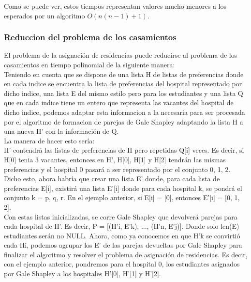 \documentclass{article}
\begin{document}
                Como se puede ver, estos tiempos representan valores mucho menores a
                los esperados por un algoritmo $O(n(n-1)+1)$.
            \subsubsection{Reduccion del problema de los casamientos}
                El problema de la asignación de residencias puede reducirse al problema
                de los casamientos en tiempo polinomial de la siguiente manera: \\
                Teniendo en cuenta que se dispone de una lista H de listas de preferencias
                donde en cada indice se encuentra la lista de preferencias del hospital
                representado por dicho indice, una lista E del mismo estilo pero para los
                estudiantes y una lista Q que en cada indice tiene un entero que representa
                las vacantes del hospital de dicho indice, podemos adaptar esta informacion
                a la necesaria para ser procesada por el algoritmo de formacion de parejas de
                Gale Shapley adaptando la lista H a una nueva H' con la información de Q. \\
                La manera de hacer esto sería: \\
                H' contendrá las listas de preferencias de H pero repetidas Q[i] veces. Es decir,
                si H[0] tenia 3 vacantes, entonces en H', H[0], H[1] y H[2] tendrán las mismas preferencias
                y el hospital 0 pasará a ser representado por el conjunto {0, 1, 2}. \\
                Dicho esto, ahora habría que crear una lista E' donde, para cada lista de
                preferencias E[i], existirá una lista E'[i] donde para cada hospital k, se
                pondrá el conjunto k = {p, q, r}. En el ejemplo anterior, si E[i] = [0], entonces
                E'[i] = [0, 1, 2]. \\
                Con estas listas inicializadas, se corre Gale Shapley que devolverá parejas para
                cada hospital de H'. Es decir, P = [(H'i, E'k), ..., (H'n, E'j)]. Donde solo len(E) estudiantes
                serán no NULL. Ahora, como ya conocemos en que H'k se convirtió cada Hi, podemos agrupar
                los E' de las parejas devueltas por Gale Shapley para finalizar el algoritmo y resolver el
                problema de asignación de residencias. Es decir, con el ejemplo anterior, pondremos para el
                hospital 0, los estudiantes asignados por Gale Shapley a los hospitales H'[0], H'[1] y H'[2]. \\
\end{document}
